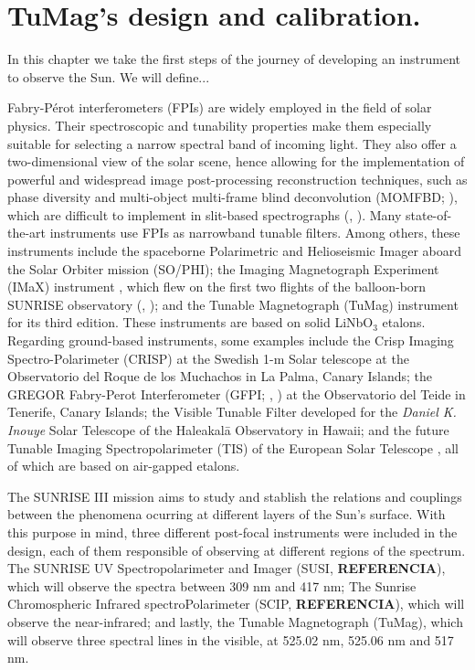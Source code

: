 \chapter{TuMag's design and calibration.}

In this chapter we take the first steps of the journey of developing an instrument to observe the Sun. We will define... 

Fabry-Pérot interferometers (FPIs) are widely employed in the field of solar physics. Their spectroscopic and tunability properties make them especially suitable for selecting a narrow spectral band of incoming light. They also offer a two-dimensional view of the solar scene, hence allowing for the implementation of powerful and widespread image post-processing reconstruction techniques, such as phase diversity \citep{PD_etalon} and multi-object multi-frame blind deconvolution (MOMFBD; \citealt{mombfd}), which are difficult to implement in slit-based spectrographs (\citealt{image_spectro}, \citealt{image_spectro_2}). Many state-of-the-art instruments use FPIs as narrowband tunable filters. Among others, these instruments include the spaceborne Polarimetric and Helioseismic Imager \citep[][]{PHI} aboard the Solar Orbiter mission \citep[][]{SO} (SO/PHI); the Imaging Magnetograph Experiment (IMaX) instrument \citep[][]{IMaX}, which flew on the first two flights of the balloon-born SUNRISE observatory (\citealt{SunriseI}, \citealt{SunriseII}); and the Tunable Magnetograph (TuMag) instrument for its third edition. These instruments are based on solid LiNbO$_3$ etalons. Regarding ground-based instruments, some examples include the Crisp Imaging Spectro-Polarimeter (CRISP) at the Swedish 1-m Solar telescope \citep[][]{crisp} at the Observatorio del Roque de los Muchachos in La Palma, Canary Islands; the GREGOR Fabry-Perot Interferometer (GFPI; \citealt{GFPI}, \citealt{GREGOR}) at the Observatorio del Teide in Tenerife, Canary Islands; the Visible Tunable Filter \citep[VTF;][]{VTF} developed for the \textit{Daniel K. Inouye} Solar Telescope \citep[DKIST;][]{DKIST} of the Haleakal\=a Observatory in Hawaii; and the future Tunable Imaging Spectropolarimeter (TIS) of the European Solar Telescope \citep{EST}, all of which are based on air-gapped etalons. 

The SUNRISE III mission aims to study and stablish the relations and couplings between the phenomena ocurring at different layers of the Sun's surface. With this purpose in mind, three different post-focal instruments were included in the design, each of them responsible of observing at different regions of the spectrum. The SUNRISE UV Spectropolarimeter and Imager (SUSI, \textbf{REFERENCIA}), which will observe the spectra between 309 nm and 417 nm; The Sunrise Chromospheric Infrared spectroPolarimeter (SCIP, \textbf{REFERENCIA}), which will observe the near-infrared; and lastly, the Tunable Magnetograph (TuMag), which will observe three spectral lines in the visible, at 525.02 nm, 525.06 nm and 517 nm. 

